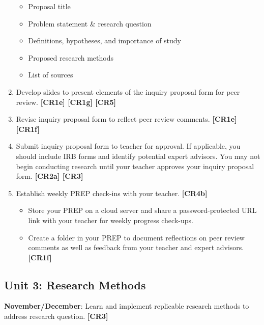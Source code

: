 \documentclass[11pt,]{article}
\providecommand{\tightlist}{%
  \setlength{\itemsep}{0pt}\setlength{\parskip}{0pt}}
\begin{document}
\begin{enumerate}
  \begin{itemize}
  \tightlist
  \item
    Proposal title
  \item
    Problem statement \& research question
  \item
    Definitions, hypotheses, and importance of study
  \item
    Proposed research methods
  \item
    List of sources
  \end{itemize}
\item
  Develop slides to present elements of the inquiry proposal form for peer review. \textbf{{[}CR1e{]} {[}CR1g{]} {[}CR5{]}}   
\item
  Revise inquiry proposal form to reflect peer review comments. \textbf{{[}CR1e{]} {[}CR1f{]}}  
\item
  Submit inquiry proposal form to teacher for approval. If applicable, you should include IRB forms and identify potential expert advisors. You may not begin conducting research until your teacher approves your inquiry proposal form. \textbf{{[}CR2a{]} {[}CR3{]}}  
\item
  Establish weekly PREP check-ins with your teacher. \textbf{{[}CR4b{]}} 

  \begin{itemize}
  \tightlist
  \item
    Store your PREP on a cloud server and share a password-protected URL link with your teacher for weekly progress check-ups.
  \item
    Create a folder in your PREP to document reflections on peer review comments as well as feedback from your teacher and expert advisors. \textbf{{[}CR1f{]}} 
  \end{itemize}
\end{enumerate}

\hypertarget{unit-3-research-methods}{%
\subsection{Unit 3: Research Methods}\label{unit-3-research-methods}}

\textbf{November/December}: Learn and implement replicable research methods to address research question. \textbf{{[}CR3{]}} 
\end{document}
